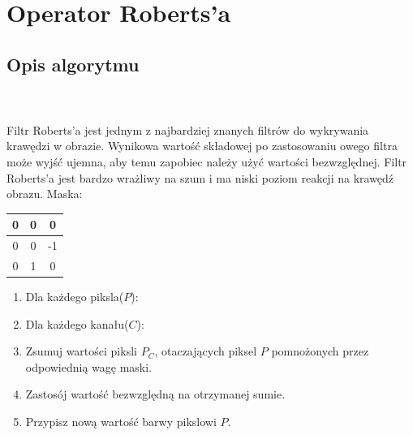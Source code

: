 \documentclass[final,a4paper,openany,12pt]{mwbk}
\begin{document}
\newpage



\section{Operator Roberts'a}
\subsection*{Opis algorytmu}
\hfill
\\\\
\indent Filtr Roberts'a jest jednym z najbardziej znanych filtrów do wykrywania krawędzi w obrazie. Wynikowa wartość składowej po zastosowaniu owego filtra może wyjść ujemna, aby temu zapobiec należy użyć wartości bezwzględnej. Filtr Roberts'a jest bardzo wrażliwy na szum i ma niski poziom reakcji na krawędź obrazu. Maska:
\begin{center}
	\begin{tabular}{|c|c|c|}
		\hline
		0 & 0 & 0\\
		\hline
		0 & 0 & -1\\
		\hline
		0 & 1 & 0\\
		\hline
	\end{tabular}
\end{center}

\begin{enumerate}
	\item Dla każdego piksla($P$):
	\item Dla każdego kanału($C$):
	\item Zsumuj wartości piksli $P_C$, otaczających piksel $P$ pomnożonych przez odpowiednią wagę maski.
	\item Zastosój wartość bezwzględną na otrzymanej sumie.
	\item Przypisz nową wartość barwy pikslowi $P$.
\end{enumerate}
\end{document}
